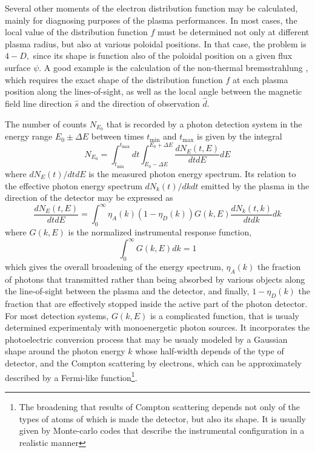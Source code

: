 Several other moments of the electron distribution function may be
calculated, mainly for diagnosing purposes of the plasma performances. In
most cases, the local value of the distribution function $f$ must be
determined not only at different plasma radius, but also at various poloidal
positions. In that case, the problem is $4-D,$ since its shape is function
also of the poloidal position on a given flux surface $\psi $. A good
example is the calculation of the non-thermal bremsstrahlung \cite{pey99},
which requires the exact shape of the distribution function $f$ at each
plasma position along the lines-of-sight, as well as the local angle between
the magnetic field line direction $\widehat{s}$ and the direction of
observation $\widehat{d}$.

The number of counts $N_{E_{0}}$ that is recorded by a photon detection
system in the energy range $E_{0}\pm\Delta E$ between times $t_{\min}$ and $%
t_{\max}$ is given by the integral
\begin{equation}
N_{E_{0}}=\int_{t_{\min}}^{t_{\max}}dt\int_{E_{0}-\Delta E}^{E_{0}+\Delta E}%
\frac{dN_{E}\left( t,E\right) }{dtdE}dE
\end{equation}
where $dN_{E}\left( t\right) /dtdE$ is the measured photon energy spectrum.
Its relation to the effective photon energy spectrum $dN_{k}\left( t\right)
/dkdt$ emitted by the plasma in the direction of the detector may be
expressed as
\begin{equation}
\frac{dN_{E}\left( t,E\right) }{dtdE}=\int_{0}^{\infty}\eta_{A}\left(
k\right) \left( 1-\eta_{D}\left( k\right) \right) G\left( k,E\right) \frac{
dN_{k}\left( t,k\right) }{dtdk}dk
\end{equation}
where $G\left( k,E\right) $ is the normalized instrumental response
function,
\begin{equation}
\int_{0}^{\infty}G\left( k,E\right) dk=1
\end{equation}
which gives the overall broadening of the energy spectrum, $\eta_{A}\left(
k\right) $ the fraction of photons that transmitted rather than being
absorbed by various objects along the line-of-sight between the plasma and
the detector, and finally, $1-\eta_{D}\left( k\right) $ the fraction that
are effectively stopped inside the active part of the photon detector. For
most detection systems, $G\left( k,E\right) $ is a complicated function,
that is usualy determined experimentaly with monoenergetic photon sources.
It incorporates the photoelectric conversion process that may be usualy
modeled by a Gaussian shape around the photon energy $k$ whose half-width
depends of the type of detector, and the Compton scattering by electrons,
which can be approximately described by a Fermi-like function\footnote{%
The broadening that results of Compton scattering depends not only of the
types of atoms of which is made the detector, but also its shape. It is
usually given by Monte-carlo codes that describe the instrumental
configuration in a realistic manner}.

